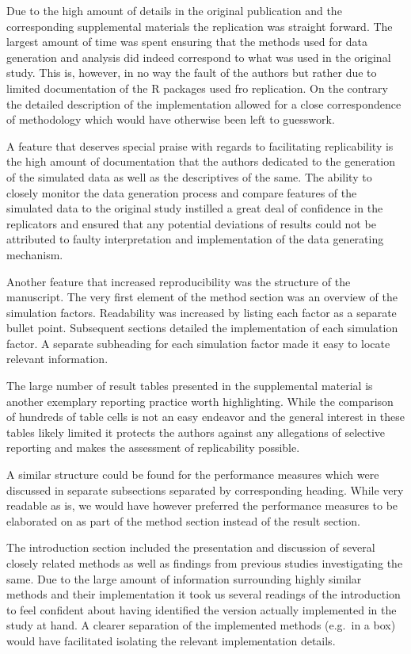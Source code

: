 \documentclass[10,a4paperpaper,]{article}
\begin{document}
Due to the high amount of details in the original publication and the
corresponding supplemental materials the replication was straight
forward. The largest amount of time was spent ensuring that the methods
used for data generation and analysis did indeed correspond to what was
used in the original study. This is, however, in no way the fault of the
authors but rather due to limited documentation of the R packages used
fro replication. On the contrary the detailed description of the
implementation allowed for a close correspondence of methodology which
would have otherwise been left to guesswork.

A feature that deserves special praise with regards to facilitating
replicability is the high amount of documentation that the authors
dedicated to the generation of the simulated data as well as the
descriptives of the same. The ability to closely monitor the data
generation process and compare features of the simulated data to the
original study instilled a great deal of confidence in the replicators
and ensured that any potential deviations of results could not be
attributed to faulty interpretation and implementation of the data
generating mechanism.

Another feature that increased reproducibility was the structure of the
manuscript. The very first element of the method section was an overview
of the simulation factors. Readability was increased by listing each
factor as a separate bullet point. Subsequent sections detailed the
implementation of each simulation factor. A separate subheading for each
simulation factor made it easy to locate relevant information.

The large number of result tables presented in the supplemental material
is another exemplary reporting practice worth highlighting. While the
comparison of hundreds of table cells is not an easy endeavor and the
general interest in these tables likely limited it protects the authors
against any allegations of selective reporting and makes the assessment
of replicability possible.

A similar structure could be found for the performance measures which
were discussed in separate subsections separated by corresponding
heading. While very readable as is, we would have however preferred the
performance measures to be elaborated on as part of the method section
instead of the result section.

The introduction section included the presentation and discussion of
several closely related methods as well as findings from previous
studies investigating the same. Due to the large amount of information
surrounding highly similar methods and their implementation it took us
several readings of the introduction to feel confident about having
identified the version actually implemented in the study at hand. A
clearer separation of the implemented methods (e.g.~in a box) would have
facilitated isolating the relevant implementation details.
\end{document}
